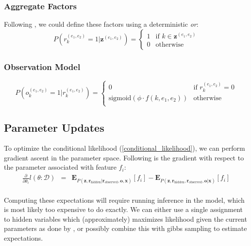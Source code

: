 \documentclass[12pt]{article}
\begin{document}
\subsubsection{Aggregate Factors}
\label{deterministic_or}
Following \cite{Hoffmann11}, we could define these factors using a deterministic \emph{or}:
\[
P(r^{(e_1,e_2)}_k=1|\mathbf{z}^{(e_1,e_2)}) =
\left\{
\begin{array}{ll}
  1  & \mbox{if } k \in \mathbf{z}^{(e_1,e_2)} \\
  0 & \mbox{otherwise } 
  \end{array}
\right.
\]

\subsubsection{Observation Model}
\[
P(o^{(e_1,e_2)}_k=1|r^{(e_1,e_2)}_k) = 
\left\{
\begin{array}{ll}
  0 & \mbox{if } r^{(e_1,e_2)}_k = 0 \\
  \text{sigmoid}\left(\phi \cdot f(k,e_1,e_2)\right) & \mbox{otherwise }  \\
  \end{array}
\right.
\]

\subsection{Parameter Updates}
To optimize the conditional likelihood (\ref{conditional_likelihood}), we can perform gradient ascent in the parameter space.  Following is the gradient with respect
to the parameter associated with feature $f_i$:
\begin{eqnarray*}
  \frac{\partial}{\partial \theta_i} l(\theta:\mathcal{D}) & = & \mathbf{E}_{P(\mathbf{z},\mathbf{r}_{\text{hidden}}|\mathbf{r}_{\text{observed}}, \mathbf{o}, \mathbf{x})}[f_i] - \mathbf{E}_{P(\mathbf{z},\mathbf{r}_{\text{hidden}}, \mathbf{r}_{\text{observed}}, \mathbf{o} | \mathbf{x})}[f_i] \\
\end{eqnarray*}

Computing these expectations will require running inference in the model, which is most likely too expensive to do exactly.
We can either use a single assignment to hidden variables which (approximately) maximizes likelihood given the current parameters as done by \cite{Hoffmann11}, or possibly
combine this with gibbs sampling to estimate expectations.
\end{document}
